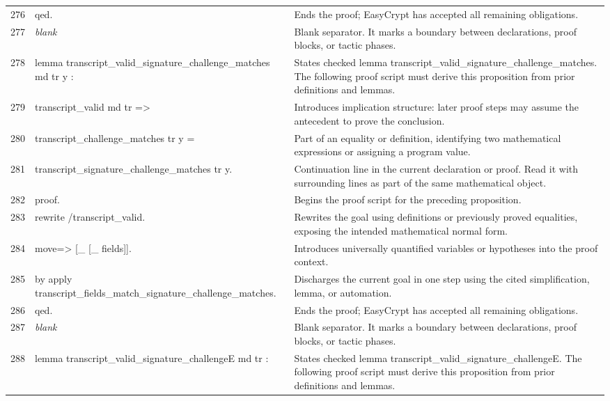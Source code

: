 \documentclass[10pt]{article}
\begin{document}
\begin{longtable}{r L{0.53\textwidth} L{0.37\textwidth}}
276 & {\ttfamily\scriptsize qed.} & Ends the proof; EasyCrypt has accepted all remaining obligations. \\
277 & {\ttfamily\scriptsize \emph{blank}} & Blank separator.  It marks a boundary between declarations, proof blocks, or tactic phases. \\
278 & {\ttfamily\scriptsize lemma transcript\_valid\_signature\_challenge\_matches md tr y :} & States checked lemma transcript\_valid\_signature\_challenge\_matches.  The following proof script must derive this proposition from prior definitions and lemmas. \\
279 & {\ttfamily\scriptsize   transcript\_valid md tr =>} & Introduces implication structure: later proof steps may assume the antecedent to prove the conclusion. \\
280 & {\ttfamily\scriptsize   transcript\_challenge\_matches tr y =} & Part of an equality or definition, identifying two mathematical expressions or assigning a program value. \\
281 & {\ttfamily\scriptsize   transcript\_signature\_challenge\_matches tr y.} & Continuation line in the current declaration or proof.  Read it with surrounding lines as part of the same mathematical object. \\
282 & {\ttfamily\scriptsize proof.} & Begins the proof script for the preceding proposition. \\
283 & {\ttfamily\scriptsize rewrite /transcript\_valid.} & Rewrites the goal using definitions or previously proved equalities, exposing the intended mathematical normal form. \\
284 & {\ttfamily\scriptsize move=> [\_ [\_ fields]].} & Introduces universally quantified variables or hypotheses into the proof context. \\
285 & {\ttfamily\scriptsize by apply transcript\_fields\_match\_signature\_challenge\_matches.} & Discharges the current goal in one step using the cited simplification, lemma, or automation. \\
286 & {\ttfamily\scriptsize qed.} & Ends the proof; EasyCrypt has accepted all remaining obligations. \\
287 & {\ttfamily\scriptsize \emph{blank}} & Blank separator.  It marks a boundary between declarations, proof blocks, or tactic phases. \\
288 & {\ttfamily\scriptsize lemma transcript\_valid\_signature\_challengeE md tr :} & States checked lemma transcript\_valid\_signature\_challengeE.  The following proof script must derive this proposition from prior definitions and lemmas. \\

\end{longtable}
\end{document}

